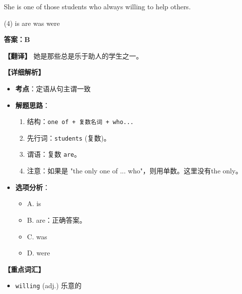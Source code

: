 \documentclass[11pt, a4paper]{article}
\newcommand{\analysis}[4]{
    \begin{solutionbox}
        \textbf{答案：#1}
        
        \textbf{【翻译】} #2
        
        \textbf{【详细解析】}
        #3
        
        \textbf{【重点词汇】}
        #4
    \end{solutionbox}
}
\newcommand{\blank}{\underline{\hspace{1.5cm}}}
\begin{document}
\begin{questions}
    \item She is one of those students who \blank always willing to help others.
    \begin{tasks}(4)
        \task is \task are \task was \task were
    \end{tasks}
    \analysis{B}{她是那些总是乐于助人的学生之一。}{
        \begin{itemize}
            \item \textbf{考点}：定语从句主谓一致
            \item \textbf{解题思路}：
                \begin{enumerate}
                    \item 结构：\texttt{one of + 复数名词 + who...}
                    \item 先行词：\texttt{students} (复数)。
                    \item 谓语：复数 \texttt{are}。
                    \item 注意：如果是 "the only one of ... who"，则用单数。这里没有the only。
                \end{enumerate}
            \item \textbf{选项分析}：
                \begin{itemize}
                    \item A. is
                    \item B. are：正确答案。
                    \item C. was
                    \item D. were
                \end{itemize}
        \end{itemize}
    }{
        \begin{itemize}
            \item \texttt{willing} (adj.) 乐意的
        \end{itemize}
    }
\end{questions}

\end{document}
